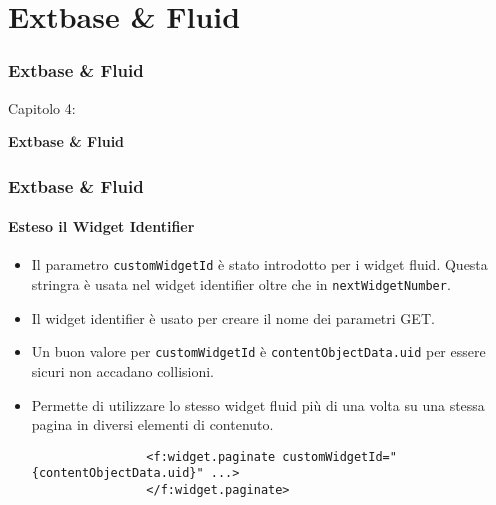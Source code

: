 %

\section{Extbase \& Fluid}
\begin{frame}[fragile]
	\frametitle{Extbase \& Fluid}

	\begin{center}\huge{Capitolo 4:}\end{center}
	\begin{center}\huge{\color{typo3darkgrey}\textbf{Extbase \& Fluid}}\end{center}

\end{frame}


\begin{frame}[fragile]
	\frametitle{Extbase \& Fluid}
	\framesubtitle{Esteso il Widget Identifier}

	\begin{itemize}
		\item Il parametro \texttt{customWidgetId} è stato introdotto per i widget fluid.
			Questa stringra è usata nel widget identifier oltre che in \texttt{nextWidgetNumber}.

		\item Il widget identifier è usato per creare il nome dei parametri GET.

		\item Un buon valore per \texttt{customWidgetId} è \texttt{{contentObjectData.uid}} per essere sicuri non accadano collisioni.

		\item Permette di utilizzare lo stesso widget fluid più di una volta su una stessa pagina in diversi elementi di contenuto.

			\begin{lstlisting}
				<f:widget.paginate customWidgetId="{contentObjectData.uid}" ...>
				</f:widget.paginate>
			\end{lstlisting}

	\end{itemize}

\end{frame}


